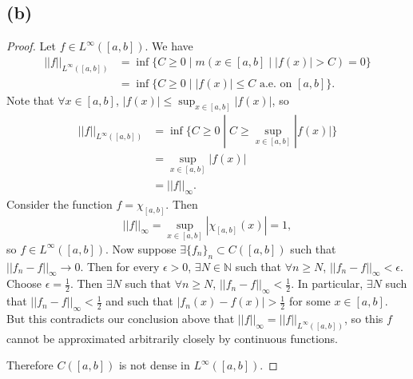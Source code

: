 \documentclass{article}
\newcommand{\N}{\mathbb{N}} %
\begin{document}
\subsection*{(b)}
\begin{proof}
	Let $f \in L^{\infty}([a, b])$. We have
	\begin{align}
		||f||_{L^{\infty}([a, b])} &= \inf \{C \geq 0 \;|\; m({x \in [a, b] \;|\; |f(x)| > C}) = 0\} \\
		&= \inf \{C \geq 0 \;|\; |f(x)| \leq C \textrm{ a.e. on } [a, b]\}.
	\end{align}
	Note that $\forall x \in [a, b]$, $|f(x)| \leq \sup_{x \in [a, b]} |f(x)|$, so
	\begin{align}
		||f||_{L^{\infty}([a, b])} &= \inf \{C \geq 0 \;|\; C \geq \sup_{x \in [a, b]} |f(x)|\} \\
		&= \sup_{x \in [a, b]} |f(x)| \\
		&= ||f||_{\infty}.
	\end{align}
	Consider the function $f = \chi_{[a, b]}$. Then 
	\begin{equation}
		||f||_{\infty} = \sup_{x \in [a, b]} |\chi_{[a, b]}(x)| = 1,
	\end{equation}
	so $f \in L^{\infty}([a, b])$. Now suppose $\exists \{f_n\}_n \subset C([a, b])$ such that $||f_n - f||_{\infty} \to 0$. Then for every $\epsilon > 0$, $\exists N \in \N$ such that $\forall n \geq N$, $||f_n - f||_{\infty} < \epsilon$. Choose $\epsilon = \frac{1}{2}$. Then $\exists N$ such that $\forall n \geq N$, $||f_n - f||_{\infty} < \frac{1}{2}$. In particular, $\exists N$ such that $||f_n - f||_{\infty} < \frac{1}{2}$ and such that $|f_n(x) - f(x)| > \frac{1}{2}$ for some $x \in [a, b]$. But this contradicts our conclusion above that $||f||_{\infty} = ||f||_{L^{\infty}([a, b])}$, so this $f$ cannot be approximated arbitrarily closely by continuous functions.
	
	Therefore $C([a, b])$ is not dense in $L^{\infty}([a, b])$.
\end{proof}
\end{document}
